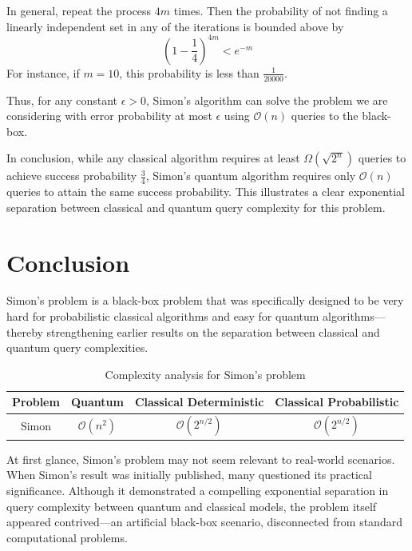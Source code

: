 In general, repeat the process $4m$ times. Then the probability of not finding a linearly independent set in any of the iterations is bounded above by
\[
\left(1 - \frac{1}{4} \right)^{4m} < e^{-m}
\]
For instance, if $m = 10$, this probability is less than $\frac{1}{20000}$.

Thus, for any constant $\epsilon > 0$, Simon's algorithm can solve the problem we are considering with error probability at most $\epsilon$ using $\mathcal{O}(n)$ queries to the black-box.

\medskip

\noindent In conclusion, while any classical algorithm requires at least $\Omega(\sqrt{2^n})$ queries to achieve success probability $\frac{3}{4}$, Simon’s quantum algorithm requires only $\mathcal{O}(n)$ queries to attain the same success probability. This illustrates a clear exponential separation between classical and quantum query complexity for this problem.


\section{Conclusion}

Simon's problem is a black-box problem that was specifically designed to be very hard for probabilistic classical algorithms and easy for quantum algorithms—thereby strengthening earlier results on the separation between classical and quantum query complexities.

\begin{table}[ht]
    \centering
    \begin{tabular}{|c|c|c|c|}
    \hline
        Problem & Quantum & Classical Deterministic & Classical Probabilistic \\
    \hline
        Simon & $\mathcal{O}(n^2)$ & $\mathcal{O}(2^{n/2})$ & $\mathcal{O}(2^{n/2})$ \\
    \hline
    \end{tabular}
    \caption{Complexity analysis for Simon's problem}
    \label{tab:simon_complexity}
\end{table}

At first glance, Simon's problem may not seem relevant to real-world scenarios. When Simon's result was initially published, many questioned its practical significance. Although it demonstrated a compelling exponential separation in query complexity between quantum and classical models, the problem itself appeared contrived—an artificial black-box scenario, disconnected from standard computational problems.

